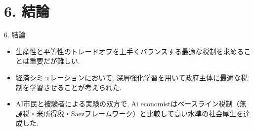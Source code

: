 \documentclass[unicode,aspectratio=169,11pt]{beamer}
\begin{document}
\section{6. 結論}

\begin{frame}{6. 結論}{}
    \begin{itemize}
        \item 生産性と平等性のトレードオフを上手くバランスする最適な税制を求めることは重要だが難しい.
        \item 経済シミュレーションにおいて, 深層強化学習を用いて政府主体に最適な税制を学習させることが考えられた.
        \item AI市民と被験者による実験の双方で, Ai economistはベースライン税制（無課税・米所得税・Saezフレームワーク）と比較して高い水準の社会厚生を達成した.
    \end{itemize}
\end{frame}
\end{document}
